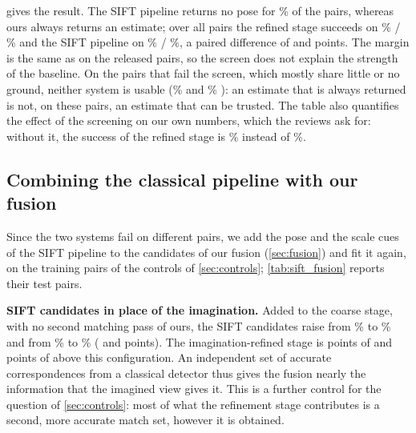  gives the result. The SIFT pipeline returns no pose for \unSiftFail\% of the pairs, whereas ours always returns an estimate; over all pairs the refined stage succeeds on \unSiiSRd\% / \unSiiSRe\% and the SIFT pipeline on \unSiftSRd\% / \unSiftSRe\%, a paired difference of \unSiiVsSiftSRd{} \ci{\unSiiVsSiftSRdLo}{\unSiiVsSiftSRdHi} and \unSiiVsSiftSRe{} \ci{\unSiiVsSiftSReLo}{\unSiiVsSiftSReHi} points. The margin is the same as on the released pairs, so the screen does not explain the strength of the baseline. On the pairs that fail the screen, which mostly share little or no ground, neither system is usable (\unFailSiiSRe\% and \unFailSiftSRe\% \SRe): an estimate that is always returned is not, on these pairs, an estimate that can be trusted. The table also quantifies the effect of the screening on our own numbers, which the reviews ask for: without it, the success of the refined stage is \unSiiSRd\% instead of \SiiCamSRd\%.



\subsection{Combining the classical pipeline with our fusion}
\label{sec:siftfusion}

Since the two systems fail on different pairs, we add the pose and the scale cues of the SIFT pipeline to the candidates of our fusion (\cref{sec:fusion}) and fit it again, on the \sfuNtrain{} training pairs of the controls of \cref{sec:controls}; \cref{tab:sift_fusion} reports their \sfuN{} test pairs.

\noindent\textbf{SIFT candidates in place of the imagination.} Added to the coarse stage, with no second matching pass of ours, the SIFT candidates raise \SRd{} from \sfuCoarseSRd\% to \sfuCoarseSiftSRd\% and \SRe{} from \sfuCoarseSRe\% to \sfuCoarseSiftSRe\% (\sfuAddCoarseSRd{} \ci{\sfuAddCoarseSRdLo}{\sfuAddCoarseSRdHi} and \sfuAddCoarseSRe{} \ci{\sfuAddCoarseSReLo}{\sfuAddCoarseSReHi} points). The imagination-refined stage is \sfuRefVsCoarseSiftSRd{} \ci{\sfuRefVsCoarseSiftSRdLo}{\sfuRefVsCoarseSiftSRdHi} points of \SRd{} and \sfuRefVsCoarseSiftSRe{} \ci{\sfuRefVsCoarseSiftSReLo}{\sfuRefVsCoarseSiftSReHi} points of \SRe{} above this configuration. An independent set of accurate correspondences from a classical detector thus gives the fusion nearly the information that the imagined view gives it. This is a further control for the question of \cref{sec:controls}: most of what the refinement stage contributes is a second, more accurate match set, however it is obtained.

